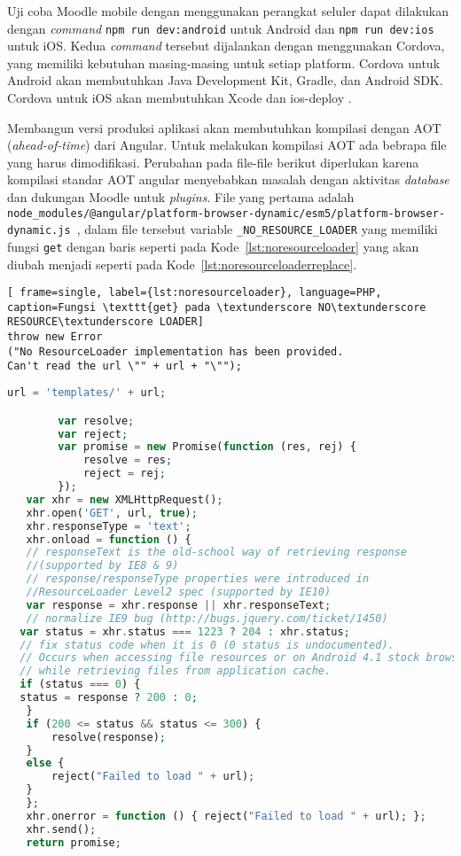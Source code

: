 Uji coba Moodle mobile dengan menggunakan perangkat seluler dapat dilakukan dengan \textit{command} \texttt{npm run dev:android} untuk Android dan \texttt{npm run dev:ios} untuk iOS. Kedua \textit{command} tersebut dijalankan dengan menggunakan Cordova, yang memiliki kebutuhan masing-masing untuk setiap platform. Cordova untuk Android akan membutuhkan Java Development Kit, Gradle, dan Android SDK\cite{cordova:android}. Cordova untuk iOS akan membutuhkan Xcode dan ios-deploy \cite{cordova:iOS}.

Membangun versi produksi aplikasi akan membutuhkan kompilasi dengan AOT (\textit{ahead-of-time}) dari Angular. Untuk melakukan kompilasi AOT ada bebrapa file yang harus dimodifikasi. Perubahan pada file-file berikut diperlukan karena kompilasi standar AOT angular menyebabkan masalah dengan aktivitas \textit{database} dan dukungan Moodle untuk \textit{plugins}.  File yang pertama adalah \texttt{node\_modules/@angular/platform-browser-dynamic/esm5/platform-browser-dynamic.js }, dalam file tersebut variable \texttt{\_NO\_RESOURCE\_LOADER} yang memiliki fungsi \texttt{get} dengan baris seperti pada \mbox{Kode \ref{lst:noresourceloader}} yang akan diubah menjadi seperti pada \mbox{Kode \ref{lst:noresourceloaderreplace}}.\cite{moodle:dev}

\begin{lstlisting}[ frame=single, label={lst:noresourceloader}, language=PHP, caption=Fungsi \texttt{get} pada \textunderscore NO\textunderscore RESOURCE\textunderscore LOADER]
throw new Error
("No ResourceLoader implementation has been provided. 
Can't read the url \"" + url + "\"");
\end{lstlisting}

\begin{lstlisting}[frame=single, label={lst:noresourceloaderreplace}, language=PHP, caption=Kode pengganti untuk fungsi \texttt{get}]
url = 'templates/' + url;

        var resolve;
        var reject;
        var promise = new Promise(function (res, rej) {
            resolve = res;
            reject = rej;
        });
   var xhr = new XMLHttpRequest();
   xhr.open('GET', url, true);
   xhr.responseType = 'text';
   xhr.onload = function () {
   // responseText is the old-school way of retrieving response 
   //(supported by IE8 & 9)
   // response/responseType properties were introduced in 
   //ResourceLoader Level2 spec (supported by IE10)
   var response = xhr.response || xhr.responseText;
   // normalize IE9 bug (http://bugs.jquery.com/ticket/1450)
  var status = xhr.status === 1223 ? 204 : xhr.status;
  // fix status code when it is 0 (0 status is undocumented).
  // Occurs when accessing file resources or on Android 4.1 stock browser
  // while retrieving files from application cache.
  if (status === 0) {
  status = response ? 200 : 0;
   }
   if (200 <= status && status <= 300) {
       resolve(response);
   }
   else {
       reject("Failed to load " + url);
   }
   };
   xhr.onerror = function () { reject("Failed to load " + url); };
   xhr.send();
   return promise;
\end{lstlisting}


